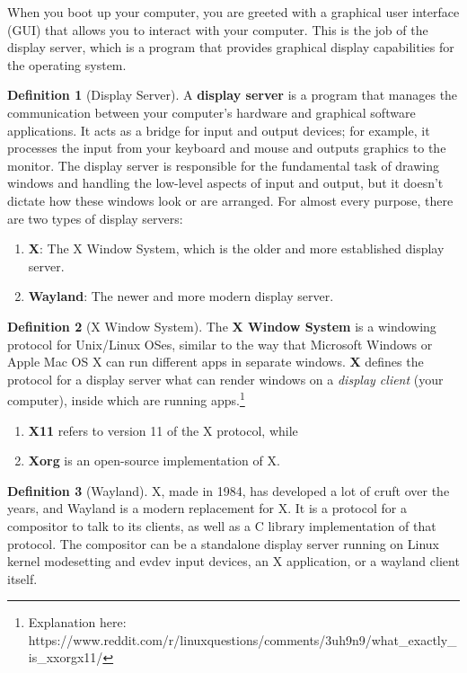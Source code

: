 \documentclass{article}
\theoremstyle{definition}
\newtheorem{definition}{Definition}[section]
\begin{document}
  When you boot up your computer, you are greeted with a graphical user interface (GUI) that allows you to interact with your computer. This is the job of the display server, which is a program that provides graphical display capabilities for the operating system. 

  \begin{definition}[Display Server]
    A \textbf{display server} is a program that manages the communication between your computer's hardware and graphical software applications. It acts as a bridge for input and output devices; for example, it processes the input from your keyboard and mouse and outputs graphics to the monitor. The display server is responsible for the fundamental task of drawing windows and handling the low-level aspects of input and output, but it doesn't dictate how these windows look or are arranged. For almost every purpose, there are two types of display servers: 
    \begin{enumerate} 
      \item \textbf{X}: The X Window System, which is the older and more established display server. 
      \item \textbf{Wayland}: The newer and more modern display server.
    \end{enumerate}
  \end{definition}

  \begin{definition}[X Window System]
    The \textbf{X Window System} is a windowing protocol for Unix/Linux OSes, similar to the way that Microsoft Windows or Apple Mac OS X can run different apps in separate windows. \textbf{X} defines the protocol for a display server what can render windows on a \textit{display client} (your computer), inside which are running apps.\footnote{Explanation here: https://www.reddit.com/r/linuxquestions/comments/3uh9n9/what\_exactly\_is\_xxorgx11/} 
    \begin{enumerate} 
      \item \textbf{X11} refers to version 11 of the X protocol, while 
      \item \textbf{Xorg} is an open-source implementation of X. 
    \end{enumerate}
  \end{definition}

  \begin{definition}[Wayland]
    X, made in 1984, has developed a lot of cruft over the years, and Wayland is a modern replacement for X. It is a protocol for a compositor to talk to its clients, as well as a C library implementation of that protocol. The compositor can be a standalone display server running on Linux kernel modesetting and evdev input devices, an X application, or a wayland client itself. 
  \end{definition}
\end{document}
